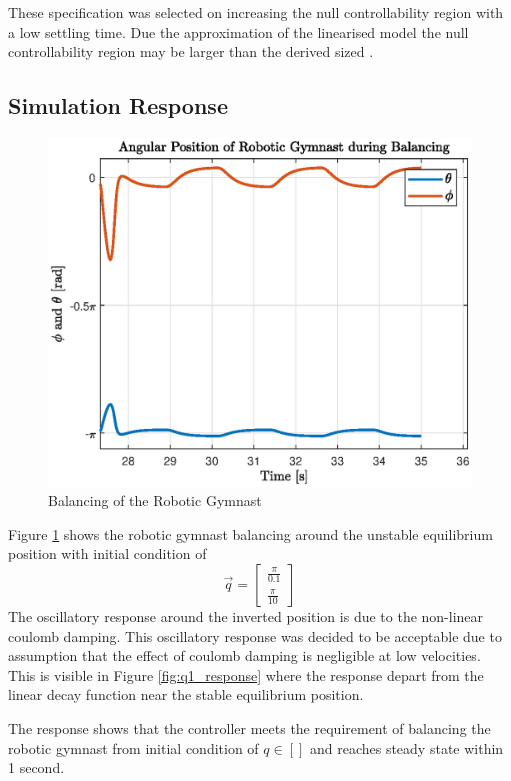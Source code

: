 These specification was selected on increasing the null controllability region with a low settling time. Due the approximation of the linearised model the null controllability region may be larger than the derived sized \cite{simple_null_controllability}. 


\subsection{Simulation Response}
\begin{figure}[h]
	\centering
	\includegraphics[scale=1]{./figs/balancing}
	\caption{Balancing of the Robotic Gymnast}
	\label{fig:balance}
\end{figure}

Figure \ref{fig:balance} shows the robotic gymnast balancing around the unstable equilibrium position with initial condition of $$ \vec{q} = 
\begin{bmatrix}
\frac{\pi}{0.1}\\
\frac{\pi}{10}
\end{bmatrix}
$$ The oscillatory response around the inverted position is due to the non-linear coulomb damping. This oscillatory response was decided to be acceptable due to assumption that the effect of coulomb damping is negligible at low velocities. This is visible in Figure \ref{fig:q1_response} where the response depart from the linear decay function near the stable equilibrium position.

The response shows that the controller meets the requirement of balancing the robotic gymnast from initial condition of $q \in []$ and reaches steady state within 1 second.





